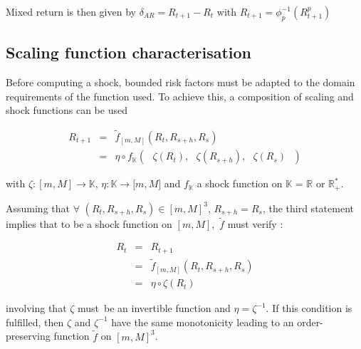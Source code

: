 \documentclass[10pt,a4paper]{report}
\begin{document}
\bigskip 

Mixed return is then given by $ \delta _{AR} =R_{t+1}-R_{t} $ with $ R_{t+1} =\phi _{p}^{-1}(R_{t+1}^{p}) $

\newpage

\subsection{Scaling function characterisation}

Before computing a shock, bounded risk factors must be adapted to the domain
requirements of the function used. To achieve this, a composition of scaling
and shock functions can be used

\begin{eqnarray*}
R_{t+1} &=&\tilde{f}_{[m,M]}\left( R_{t},R_{s+h},R_{s}\right)  \\
&=&\eta \circ f_{\mathbb{K}}\left( \text{ }\zeta (R_{t}),\text{ }\zeta
(R_{s+h}),\text{ }\zeta (R_{s})\text{ }\right) 
\end{eqnarray*}

\bigskip

with $\zeta :[m,M]\rightarrow \mathbb{K}$, $\eta :\mathbb{K}\rightarrow
\lbrack m,M]$ and $f_{\mathbb{K}}$ a shock function on $\mathbb{K}$ = $%
\mathbb{R}$ or $\mathbb{R}_{+}^{\ast }$.

\bigskip
\bigskip

 Assuming that $\forall $ $%
(R_{t},R_{s+h},R_{s})\in \left[ m,M\right] ^{3}$, $R_{s+h}=R_{s}$, the third statement implies that to be a shock function on $[m,M],$ $\tilde{f}$ must verify : 

\begin{eqnarray*}
R_{t} &=&R_{t+1} \\
&=&\tilde{f}_{[m,M]}\left( R_{t},R_{s+h},R_{s}\right)  \\
&=&\eta \circ \zeta (R_{t})
\end{eqnarray*}

\bigskip

involving that $\zeta $ must\ be an invertible function and $\eta =\zeta ^{-1}$. If this condition is fulfilled, then $\zeta $ and $\zeta ^{-1}$ have the same monotonicity leading to an order-preserving function $\tilde{f}$ on $\left[ m,M\right]^{3}$.
\end{document}
